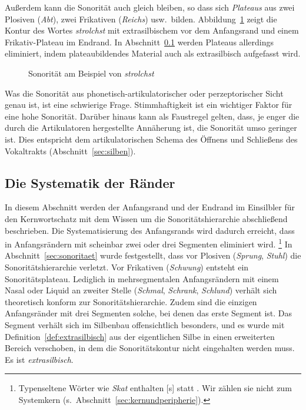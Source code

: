 Außerdem kann die Sonorität auch gleich bleiben, so dass sich \textit{Plateaus} aus zwei Plosiven (\textit{Abt}), zwei Frikativen (\textit{Reichs}) usw.\ bilden.
Abbildung~\ref{fig:sonoritaet102} zeigt die Kontur des Wortes \textit{strolchst} mit extrasilbischem \textipa{[S]} vor dem Anfangsrand und einem Frikativ-Plateau im Endrand.
In Abschnitt~\ref{sec:diesystematikderraender} werden Plateaus allerdings eliminiert, indem plateaubildendes Material auch als extrasilbisch aufgefasst wird.

\begin{figure}[!htbp]
  \centering
  \caption{Sonorität am Beispiel von \textit{strolchst}}
  \label{fig:sonoritaet102}
\end{figure}

Was die Sonorität aus phonetisch-artikulatorischer oder perzeptorischer Sicht genau ist, ist eine schwierige Frage.
Stimmhaftigkeit ist ein wichtiger Faktor für eine hohe Sonorität.
Darüber hinaus kann als Faustregel gelten, dass, je enger die durch die Artikulatoren hergestellte Annäherung ist, die Sonorität umso geringer ist.
Dies entspricht dem artikulatorischen Schema des Öffnens und Schließens des Vokaltrakts (Abschnitt~\ref{sec:silben}).

\subsection{Die Systematik der Ränder}
\label{sec:diesystematikderraender}


In diesem Abschnitt werden der Anfangsrand und der Endrand im Einsilbler für den Kernwortschatz mit dem Wissen um die Sonoritätshierarchie abschließend beschrieben.
Die Systematisierung des Anfangsrands wird dadurch erreicht, dass \textipa{[S]} in Anfangsrändern mit scheinbar zwei oder drei Segmenten eliminiert wird.%
\footnote{Typenseltene Wörter wie \textit{Skat} enthalten [s] statt \textipa{[S]}.
Wir zählen sie nicht zum Systemkern (s.\ Abschnitt~\ref{sec:kernundperipherie}).}
In Abschnitt~\ref{sec:sonoritaet} wurde festgestellt, dass \textipa{[S]} vor Plosiven (\textit{Sprung}, \textit{Stuhl}) die Sonoritätshierarchie verletzt.
Vor Frikativen (\textit{Schwung}) entsteht ein Sonoritätsplateau.
Lediglich in mehrsegmentalen Anfangsrändern mit einem Nasal oder Liquid an zweiter Stelle (\textit{Schmal}, \textit{Schrank}, \textit{Schlund}) verhält sich \textipa{[S]} theoretisch konform zur Sonoritätshierarchie.
Zudem sind die einzigen Anfangsränder mit drei Segmenten solche, bei denen das erste Segment \textipa{[S]} ist.
Das Segment \textipa{[S]} verhält sich im Silbenbau offensichtlich besonders, und es wurde mit Definition~\ref{def:extrasilbisch} aus der eigentlichen Silbe in einen erweiterten Bereich verschoben, in dem die Sonoritätskontur nicht eingehalten werden muss.
Es ist \textit{extrasilbisch}.

